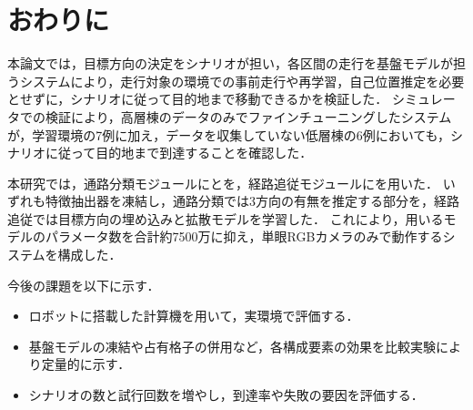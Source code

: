 \chapter{おわりに}
\label{chap:conclusion}

本論文では，目標方向の決定をシナリオが担い，各区間の走行を基盤モデルが担うシステムにより，走行対象の環境での事前走行や再学習，自己位置推定を必要とせずに，シナリオに従って目的地まで移動できるかを検証した．
シミュレータでの検証により，高層棟のデータのみでファインチューニングしたシステムが，学習環境の7例に加え，データを収集していない低層棟の6例においても，シナリオに従って目的地まで到達することを確認した．

本研究では，通路分類モジュールに\DINOvTwo と\UniDepth を，経路追従モジュールに\NoMaD を用いた．
いずれも特徴抽出器を凍結し，通路分類では3方向の有無を推定する部分を，経路追従では目標方向の埋め込みと拡散モデルを学習した．
これにより，用いるモデルのパラメータ数を合計約7500万に抑え，単眼RGBカメラのみで動作するシステムを構成した．

今後の課題を以下に示す．
\begin{itemize}
  \item ロボットに搭載した計算機を用いて，実環境で評価する．
  \item 基盤モデルの凍結や占有格子の併用など，各構成要素の効果を比較実験により定量的に示す．
  \item シナリオの数と試行回数を増やし，到達率や失敗の要因を評価する．
\end{itemize}

